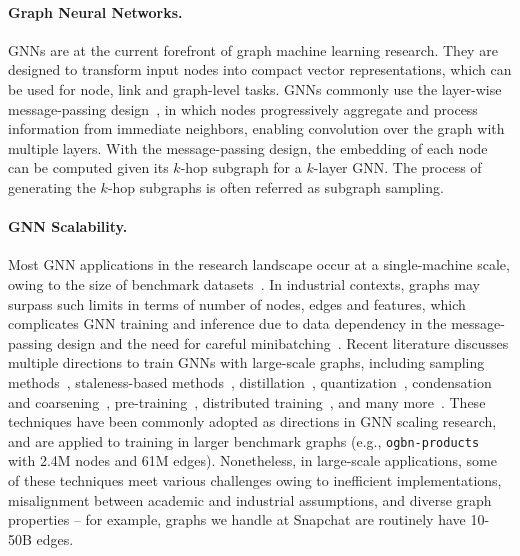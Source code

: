 
\paragraph{Graph Neural Networks.}
GNNs are at the current forefront of graph machine learning research. 
They are designed to transform input nodes into compact vector representations, which can be used for node, link and graph-level tasks. GNNs commonly use the layer-wise message-passing design~\citep{kipf2016semi,veličković2018graph,xu2018powerful,Gao2018LargeScaleLG,wu2020comprehensive,ma2021unified}, in which nodes progressively aggregate and process information from immediate neighbors, enabling convolution over the graph with multiple layers. With the message-passing design, the embedding of each node can be computed given its $k$-hop subgraph for a $k$-layer GNN. The process of generating the $k$-hop subgraphs is often referred as subgraph sampling.

\paragraph{GNN Scalability.}
Most GNN applications in the research landscape occur at a single-machine scale, owing to the size of benchmark datasets~\cite{hu2020open}.  In industrial contexts, graphs may surpass such limits in terms of number of nodes, edges and features, which complicates GNN training and inference due to data dependency in the message-passing design and the need for careful minibatching~\citep{duan2022comprehensive,xue2024large}. 
Recent literature discusses multiple directions to train GNNs with large-scale graphs, including sampling methods~\citep{hamilton2017inductive,chen2018fastgcn}, staleness-based methods~\citep{fey2021gnnautoscale,xue2024haste},  distillation~\citep{zhang2021graph,guo2023linkless}, quantization~\citep{ding2021vq}, condensation and coarsening~\citep{jin2021graph, tsitsulin2023graph}, pre-training~\citep{han2022mlpinit, borisyuk2024lignn}, distributed training~\citep{md2021distgnn, lin2023comprehensive}, and many more~\citep{xue2024large}.
These techniques have been commonly adopted as directions in GNN scaling research, and are applied to training in larger benchmark graphs (e.g., {\small\texttt{ogbn-products}}~\citep{hu2020open} with 2.4M nodes and 61M edges). Nonetheless, in large-scale applications, some of these techniques meet various challenges owing to inefficient implementations, misalignment between academic and industrial assumptions, and diverse graph properties \cite{palowitch2022graphworld} -- for example, graphs we handle at Snapchat are routinely have 10-50B edges. 

